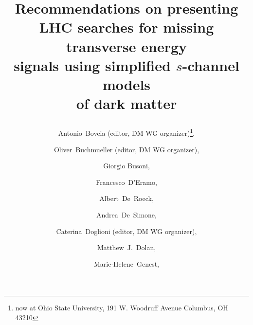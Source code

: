 \documentclass[review]{elsarticle}
\begin{document}
\title{\begin{boldmath} \huge Recommendations on presenting LHC searches for missing transverse energy \\ signals using simplified $s$-channel models \\ of dark matter \vspace{7mm} \end{boldmath}}





\author[1]{Antonio~Boveia (editor, DM WG organizer)\footnote{now at Ohio State University, 191 W. Woodruff Avenue Columbus, OH 43210},}
\address[1]{CERN, EP Department, CH-1211 Geneva 23, Switzerland}

\author[2]{Oliver~Buchmueller (editor, DM WG organizer),}
\address[2]{High Energy Physics Group, Blackett Laboratory, Imperial College, Prince Consort Road, London, SW7 2AZ, United Kingdom}

\author[3]{Giorgio Busoni,} 
\address[3]{ARC Centre of Excellence for Particle Physics at the Terascale, School of Physics, University of Melbourne, 3010, Australia}

\author[4]{Francesco~D'Eramo,} 
\address[4]{UC, Santa Cruz and UC, Santa Cruz, Inst. Part. Phys., USA}

\author[1,5]{Albert~De~Roeck,}
\address[5]{Antwerp University, B2610 Wilrijk, Belgium}

\author[6]{Andrea~De~Simone,}
\address[6]{SISSA and INFN Sezione di Trieste, via Bonomea 265, I-34136 Trieste, Italy}

\author[7]{Caterina~Doglioni (editor, DM WG organizer),}
\address[7]{Fysiska institutionen, Lunds universitet, Lund, Sweden}

\author[3]{Matthew~J.~Dolan,}

\author[8]{Marie-Helene~Genest,} 
\address[8]{LPSC, Universite Grenoble-Alpes, CNRS/IN2P3, France}
\end{document}
